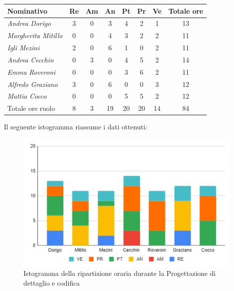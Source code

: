 {{{{{{{{	\begin{center}
		\renewcommand{\arraystretch}{1.4}
		\begin{tabularx}{\textwidth}{|X|c|c|c|c|c|c|c|}
			\hline
			\rowcolor{airforceblue}
			\textbf{Nominativo} & \textbf{Re} & \textbf{Am} & \textbf{An} & \textbf{Pt} & \textbf{Pr} & \textbf{Ve} & \textbf{Totale ore}\\
			\hline
			\textit{Andrea Dorigo} & 3 & 0 & 3 & 4 & 2 & 1 & 13\\
			\hline
			\textit{Margherita Mitillo} & 0 & 0 & 4 & 3 & 2 & 2 & 11\\
			\hline
			\textit{Igli Mezini} & 2 & 0 & 6 & 1 & 0 & 2 & 11\\
			\hline
			\textit{Andrea Cecchin} & 0 & 3 & 0 & 4 & 5 & 2 & 14\\
			\hline
			\textit{Emma Roveroni} & 0 & 0 & 0 & 3 & 6 & 2 & 11\\
			\hline
			\textit{Alfredo Graziano} & 3 & 0 & 6 & 0 & 0 & 3 & 12\\
			\hline
			\textit{Mattia Cocco} & 0 & 0 & 0 & 5 & 5 & 2 & 12\\
			\hline
			Totale ore ruolo & 8 & 3 & 19 & 20 & 20 & 14 & 84\\
			\hline
		\end{tabularx}
	\end{center}
Il seguente istogramma riassume i dati ottenuti:
\begin{figure}[!h]
	\begin{center}
		\includegraphics[width=0.7\linewidth]{../immagini/pdp/istogramma_progettazione_dettaglio_periodo1.png}
		\caption{Istogramma della ripartizione oraria durante la Progettazione di
			dettaglio e codifica}
	\end{center}
\end{figure}
\clearpage
}}}}}}}}
